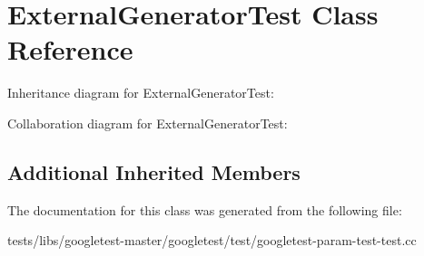 \hypertarget{classExternalGeneratorTest}{}\section{External\+Generator\+Test Class Reference}
\label{classExternalGeneratorTest}


Inheritance diagram for External\+Generator\+Test\+:


Collaboration diagram for External\+Generator\+Test\+:
\subsection*{Additional Inherited Members}


The documentation for this class was generated from the following file\+:\begin{DoxyCompactItemize}
\item 
tests/libs/googletest-\/master/googletest/test/googletest-\/param-\/test-\/test.\+cc\end{DoxyCompactItemize}
